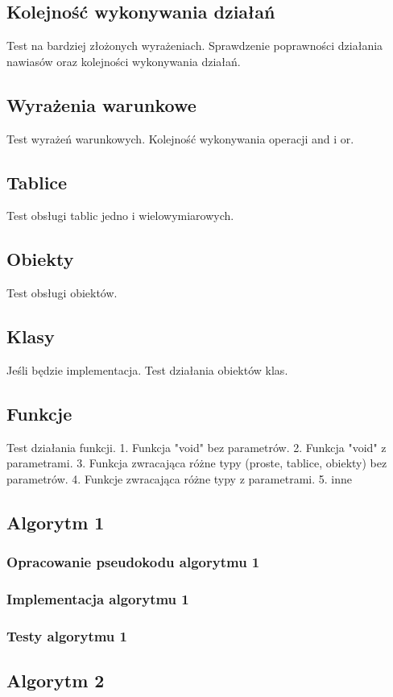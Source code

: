\documentclass[a4paper]{article}
\begin{document}
\subsection{Kolejność wykonywania działań}
Test na bardziej złożonych wyrażeniach. Sprawdzenie poprawności działania nawiasów oraz kolejności wykonywania działań.
\subsection{Wyrażenia warunkowe}
Test wyrażeń warunkowych. Kolejność wykonywania operacji and i or.
\subsection{Tablice}
Test obsługi tablic jedno i wielowymiarowych.
\subsection{Obiekty}
Test obsługi obiektów.
\subsection{Klasy}
Jeśli będzie implementacja.
Test działania obiektów klas.
\subsection{Funkcje}
Test działania funkcji.
1. Funkcja "void" bez parametrów.
2. Funkcja "void" z parametrami.
3. Funkcja zwracająca różne typy (proste, tablice, obiekty) bez parametrów.
4. Funkcje zwracająca różne typy z parametrami.
5. inne

\subsection{Algorytm 1}
\subsubsection{Opracowanie pseudokodu algorytmu 1}
\subsubsection{Implementacja algorytmu 1}
\subsubsection{Testy algorytmu 1}
\subsection{Algorytm 2}
\end{document}
